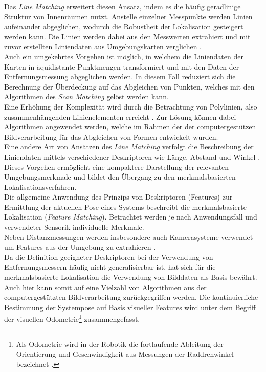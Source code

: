 Das \textit{Line Matching} erweitert diesen Ansatz, indem es die häufig geradlinige Struktur von Innenräumen nutzt. Anstelle einzelner Messpunkte werden Linien aufeinander abgeglichen, wodurch die Robustheit der Lokalisation gesteigert werden kann. Die Linien werden dabei aus den Messwerten extrahiert und mit zuvor erstellten Liniendaten aus Umgebungskarten verglichen \cite{Cox1991}\cite{Gutmann1999}.\\
Auch ein umgekehrtes Vorgehen ist möglich, in welchem die Liniendaten der Karten in äquidistante Punktmengen transformiert und mit den Daten der Entfernungsmessung abgeglichen werden. In diesem Fall reduziert sich die Berechnung der Überdeckung auf das Abgleichen von Punkten, welches mit den Algorithmen des \textit{Scan Matching} gelöst werden kann.\\

Eine Erhöhung der Komplexität wird durch die Betrachtung von Polylinien, also zusammenhängenden Linienelementen erreicht \cite{Wolter2004}. Zur Lösung können dabei Algorithmen angewendet werden, welche im Rahmen der der computergestützen Bildverarbeitung für das Abgleichen von Formen entwickelt wurden.\\
Eine andere Art von Ansätzen des \textit{Line Matching} verfolgt die Beschreibung der Liniendaten mittels verschiedener Deskriptoren wie Länge, Abstand und Winkel \cite{Frey2014}\cite{Garulli2005}. Dieses Vorgehen ermöglicht eine kompaktere Darstellung der relevanten Umgebungsmerkmale und bildet den Übergang zu den merkmalsbasierten Lokalisationsverfahren.\\

Die allgemeine Anwendung des Prinzips von Deskriptoren (Features) zur Ermittlung der aktuellen Pose eines Systems beschreibt die merkmalsbasierte Lokalisation (\textit{Feature Matching}). Betrachtet werden je nach Anwendungsfall und verwendeter Sensorik individuelle Merkmale.\\
Neben Distanzmessungen \cite{Tomono2004} werden insbesondere auch Kamerasysteme verwendet um Features aus der Umgebung zu extrahieren \cite{Se2001}.\\
Da die Definition geeigneter Deskriptoren bei der Verwendung von Entfernungsmessern häufig nicht generalisierbar ist, hat sich für die merkmalsbasierte Lokalisation die Verwendung von Bilddaten als Basis bewährt. Auch hier kann somit auf eine Vielzahl von Algorithmen aus der computergestützten Bildverarbeitung zurückgegriffen werden. 
Die kontinuierliche Bestimmung der Systempose auf Basis visueller Features wird unter dem Begriff der visuellen Odometrie\footnote{Als Odometrie wird in der Robotik die fortlaufende Ableitung der Orientierung und Geschwindigkeit aus Messungen der Raddrehwinkel bezeichnet \cite{Hertzberg2012}.} \cite{Mccarthy2003} zusammengefasst.\\


